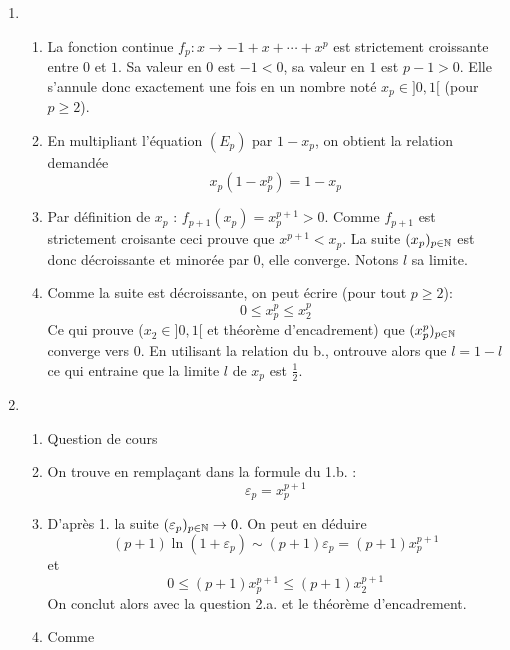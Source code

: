 \begin{enumerate}
 \item \begin{enumerate}
 \item La fonction continue $f_p : x\rightarrow -1 +x + \cdots +x^{p}$ est strictement croissante entre $0$ et $1$. Sa valeur en $0$ est $-1<0$, sa valeur en $1$ est $p-1>0$. Elle s'annule donc exactement une fois en un nombre noté $x_p \in ]0,1[$ (pour $p\geq 2$).
\item En multipliant l'équation $(E_p)$ par $1-x_p$, on obtient la relation demandée
\begin{displaymath}
 x_p(1-x_p^p)=1-x_p
\end{displaymath}
\item Par définition de $x_p$ : $f_{p+1}(x_p)=x_p^{p+1}>0$. Comme $f_{p+1}$ est strictement croisante ceci prouve que $x^{p+1}<x_p$. La suite $(x_p)_{p\in\mathbb{N}}$ est donc décroissante et minorée par $0$, elle converge. Notons $l$ sa limite.
\item Comme la suite est décroissante, on peut écrire (pour tout $p\geq 2$):
\begin{displaymath}
 0\leq x_p^p \leq x_2^p
\end{displaymath}
Ce qui prouve ($x_2\in ]0,1[$ et théorème d'encadrement) que $(x_p^p)_{p\in\mathbb{N}}$ converge vers 0. En utilisant la relation du b., ontrouve alors que $l = 1-l$ ce qui entraine que la limite $l$ de $x_p$ est $\frac{1}{2}$.
\end{enumerate}
\item \begin{enumerate}
 \item Question de cours
 \item On trouve en remplaçant dans la formule du 1.b. :
\begin{displaymath}
 \varepsilon_p = x_p^{p+1}
\end{displaymath}
\item D'après 1. la suite $(\varepsilon_p)_{p\in\mathbb{N}}\rightarrow 0$. On peut en déduire
\begin{displaymath}
 (p+1)\ln (1+\varepsilon_p) \sim (p+1)\varepsilon_p = (p+1)x_p^{p+1}
\end{displaymath}
 et 
\begin{displaymath}
 0 \leq (p+1)x_p^{p+1} \leq (p+1)x_2^{p+1}
\end{displaymath}
On conclut alors avec la question 2.a. et le théorème d'encadrement.
\item Comme
\begin{align*}

\end{align*}
\end{enumerate}
\end{enumerate}
